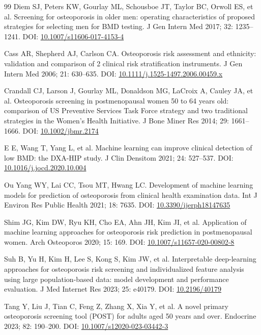\documentclass[11pt,a4paper]{article}
\begin{document}
\begin{thebibliography}{99}
 Diem SJ, Peters KW, Gourlay ML, Schousboe JT, Taylor BC, Orwoll ES, et al. Screening for osteoporosis in older men: operating characteristics of proposed strategies for selecting men for BMD testing. J Gen Intern Med 2017; 32: 1235--1241. DOI: \href{https://doi.org/10.1007/s11606-017-4153-4}{10.1007/s11606-017-4153-4}

 Cass AR, Shepherd AJ, Carlson CA. Osteoporosis risk assessment and ethnicity: validation and comparison of 2 clinical risk stratification instruments. J Gen Intern Med 2006; 21: 630--635. DOI: \href{https://doi.org/10.1111/j.1525-1497.2006.00459.x}{10.1111/j.1525-1497.2006.00459.x}

 Crandall CJ, Larson J, Gourlay ML, Donaldson MG, LaCroix A, Cauley JA, et al. Osteoporosis screening in postmenopausal women 50 to 64 years old: comparison of US Preventive Services Task Force strategy and two traditional strategies in the Women's Health Initiative. J Bone Miner Res 2014; 29: 1661--1666. DOI: \href{https://doi.org/10.1002/jbmr.2174}{10.1002/jbmr.2174}

 E E, Wang T, Yang L, et al. Machine learning can improve clinical detection of low BMD: the DXA-HIP study. J Clin Densitom 2021; 24: 527--537. DOI: \href{https://doi.org/10.1016/j.jocd.2020.10.004}{10.1016/j.jocd.2020.10.004}

 Ou Yang WY, Lai CC, Tsou MT, Hwang LC. Development of machine learning models for prediction of osteoporosis from clinical health examination data. Int J Environ Res Public Health 2021; 18: 7635. DOI: \href{https://doi.org/10.3390/ijerph18147635}{10.3390/ijerph18147635}

 Shim JG, Kim DW, Ryu KH, Cho EA, Ahn JH, Kim JI, et al. Application of machine learning approaches for osteoporosis risk prediction in postmenopausal women. Arch Osteoporos 2020; 15: 169. DOI: \href{https://doi.org/10.1007/s11657-020-00802-8}{10.1007/s11657-020-00802-8}

 Suh B, Yu H, Kim H, Lee S, Kong S, Kim JW, et al. Interpretable deep-learning approaches for osteoporosis risk screening and individualized feature analysis using large population-based data: model development and performance evaluation. J Med Internet Res 2023; 25: e40179. DOI: \href{https://doi.org/10.2196/40179}{10.2196/40179}

 Tang Y, Liu J, Tian C, Feng Z, Zhang X, Xia Y, et al. A novel primary osteoporosis screening tool (POST) for adults aged 50 years and over. Endocrine 2023; 82: 190--200. DOI: \href{https://doi.org/10.1007/s12020-023-03442-3}{10.1007/s12020-023-03442-3}


\end{thebibliography}
\end{document}
